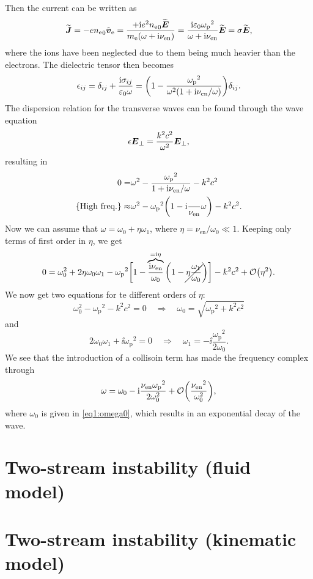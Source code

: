 \documentclass[11pt,a4paper, 
swedish, english %
]{article}
\newcommand{\enull}{\ensuremath{\varepsilon_{0}}}
\newcommand{\mee}{\ensuremath{m_{\text{e}}}}
\newcommand{\nee}{\ensuremath{{n_{\text{e}}}}}
\newcommand{\nuen}{\ensuremath{{\nu_{\text{en}}}}}
\newcommand{\wpe}{\ensuremath{{\omega_{\text{p}}}}}
\begin{document}
Then the current can be written as
\begin{equation}
\widetilde{\vb*J} = -e\nee_0\tilde{\vb*v}_\ee 
=\frac{+\ii e^2\nee_0 \widetilde{\vb*E}}{\mee(\omega + \ii\nuen)}
=\frac{\ii \enull\wpe^2}{\omega + \ii\nuen}\widetilde{\vb*E}
=\sigma\widetilde{\vb*E},
\end{equation}
where the ions have been neglected due to them being much heavier than
the electrons. The dielectric tensor then becomes
\begin{equation}
\epsilon_{ij}=\delta_{ij}+\frac{\ii \sigma_{ij}}{\enull\omega}
=\qty(1-\frac{\wpe^2}{\omega^2(1 + \ii\nuen/\omega)})\delta_{ij}.
\end{equation}
The dispersion relation for the transverse waves can be found through
the wave equation
\begin{equation}
\epsilon\vb*E_\perp = \frac{k^2c^2}{\omega^2}\vb*E_\perp,
\end{equation}
resulting in
\begin{equation}
\begin{aligned}
0=&\omega^2-\frac{\wpe^2}{1 + \ii\nuen/\omega}-k^2c^2\\
\qty{\text{High freq.}}\approx&
\omega^2-\wpe^2\qty(1-\ii\frac\nuen\omega)-k^2c^2.
\end{aligned}
\end{equation}
Now we can assume that $\omega=\omega_0+\eta\omega_1$, where
$\eta=\nuen/\omega_0\ll1$. Keeping only terms of first order
in $\eta$, we get
\begin{equation}
0=\omega_0^2+2\eta\omega_0\omega_1
-\wpe^2\bigg[1-
\overbrace{\frac{\ii\nuen}{\omega_0}}^{=\ii\eta}
\qty(1-\cancel{\eta\frac{\omega_1}{\omega_0}})\bigg]
-k^2c^2+\order{\eta^2}.
\end{equation}
We now get two equations for te different orders of $\eta$:
\begin{equation}\label{eq1:omega0}
\omega_0^2-\wpe^2-k^2c^2=0
\quad\Longrightarrow\quad
\omega_0=\sqrt{\wpe^2+k^2c^2}
\end{equation}
and
\begin{equation}
2\omega_0\omega_1 +\ii\wpe^2=0
\quad\Longrightarrow\quad
\omega_1=-\ii\frac{\wpe^2}{2\omega_0}.
\end{equation}
We see that the introduction of a collisoin term has made the
frequency complex through
\begin{equation}
\omega=\omega_0-\ii\frac{\nuen\wpe^2}{2\omega_0^2}
+\order{\frac{\nuen^2}{\omega_0^2}},
\end{equation}
where $\omega_0$ is given in \eqref{eq1:omega0}, which results in
an exponential decay of the wave. 

\section{Two-stream instability (fluid model)}


\section{Two-stream instability (kinematic model)}




\end{document}
